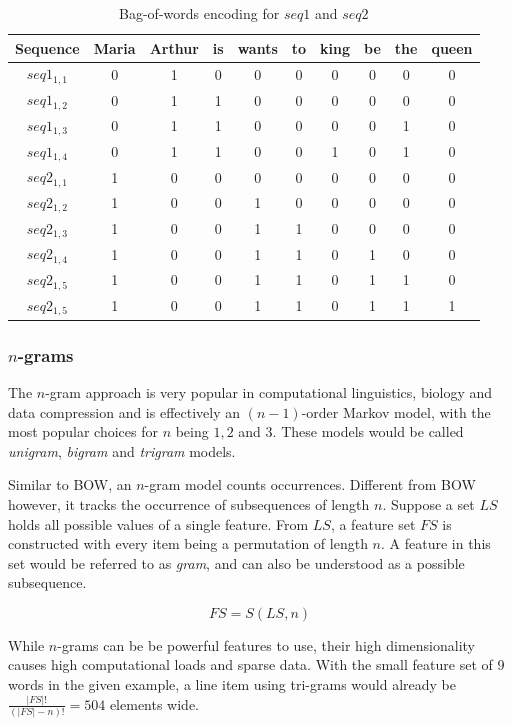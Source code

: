 \begin{table}
    \centering
    \begin{tabular}{c|ccccccccc}
        Sequence & Maria & Arthur & is & wants & to & king & be & the & queen\\
        \hline
        $seq1_{1,1}$ & 0 & 1 & 0 & 0 & 0 & 0 & 0 & 0 & 0\\
        $seq1_{1,2}$ & 0 & 1 & 1 & 0 & 0 & 0 & 0 & 0 & 0\\
        $seq1_{1,3}$ & 0 & 1 & 1 & 0 & 0 & 0 & 0 & 1 & 0\\
        $seq1_{1,4}$ & 0 & 1 & 1 & 0 & 0 & 1 & 0 & 1 & 0\\
        \hline
        $seq2_{1,1}$ & 1 & 0 & 0 & 0 & 0 & 0 & 0 & 0 & 0\\
        $seq2_{1,2}$ & 1 & 0 & 0 & 1 & 0 & 0 & 0 & 0 & 0\\
        $seq2_{1,3}$ & 1 & 0 & 0 & 1 & 1 & 0 & 0 & 0 & 0\\
        $seq2_{1,4}$ & 1 & 0 & 0 & 1 & 1 & 0 & 1 & 0 & 0\\
        $seq2_{1,5}$ & 1 & 0 & 0 & 1 & 1 & 0 & 1 & 1 & 0\\
        $seq2_{1,5}$ & 1 & 0 & 0 & 1 & 1 & 0 & 1 & 1 & 1\\
    \end{tabular}
    \caption{Bag-of-words encoding for $seq1$ and $seq2$}
    \label{tab:bow-encoding}
\end{table}
\subsubsection*{$n$-grams}
The $n$-gram approach is very popular in computational linguistics, biology and data compression and is effectively an $(n-1)$-order Markov model, with the most popular choices for $n$ being $1,2$ and $3$. These models would be called \textit{unigram}, \textit{bigram} and \textit{trigram} models.

Similar to BOW, an $n$-gram model counts occurrences. Different from BOW however, it tracks the occurrence of subsequences of length $n$. Suppose a set $LS$ holds all possible values of a single feature. From $LS$, a feature set $FS$ is constructed with every item being a permutation of length $n$. A feature in this set would be referred to as \textit{gram}, and can also be understood as a possible subsequence.

$$
FS = S(LS, n)
$$

While $n$-grams can be be powerful features to use, their high dimensionality causes high computational loads and sparse data. With the small feature set of 9 words in the given example, a line item using tri-grams would already be $\frac{|FS|!}{(|FS|-n)!}=504$ elements wide.

